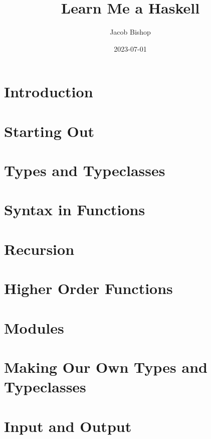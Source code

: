 \documentclass{article}
\title{Learn Me a Haskell}
\author{Jacob Bishop}
\date{2023-07-01}
\begin{document}
\maketitle
\newpage

\section{Introduction}

\newpage

\section{Starting Out}

\newpage

\section{Types and Typeclasses}

\newpage

\section{Syntax in Functions}

\newpage

\section{Recursion}

\newpage

\section{Higher Order Functions}

\newpage

\section{Modules}

\newpage

\section{Making Our Own Types and Typeclasses}

\newpage

\section{Input and Output}

\newpage
\end{document}
